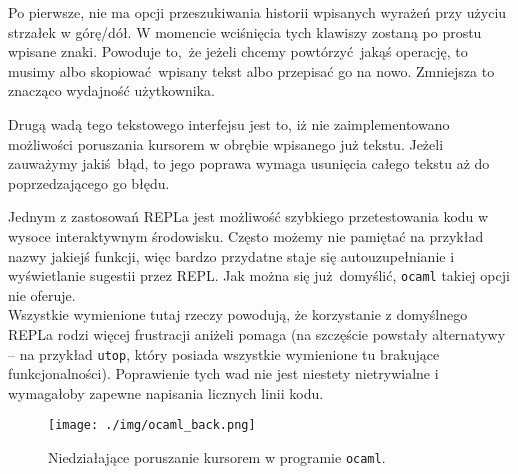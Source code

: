 \documentclass[12pt, a4paper, oneside]{report}
\begin{document}
Po pierwsze, nie ma opcji przeszukiwania historii wpisanych wyrażeń przy użyciu
strzałek w górę/dół. W momencie wciśnięcia tych klawiszy zostaną po prostu
wpisane znaki. Powoduje to, że jeżeli chcemy powtórzyć jakąś operację, to musimy
albo skopiować wpisany tekst albo przepisać go na nowo. Zmniejsza to znacząco
wydajność użytkownika.

Drugą wadą tego tekstowego interfejsu jest to, iż nie zaimplementowano
możliwości poruszania kursorem w obrębie wpisanego już tekstu. Jeżeli zauważymy
jakiś błąd, to jego poprawa wymaga usunięcia całego tekstu aż do poprzedzającego
go błędu.

Jednym z zastosowań REPLa jest możliwość szybkiego przetestowania kodu w wysoce
interaktywnym środowisku. Często możemy nie pamiętać na przykład nazwy jakiejś 
funkcji, więc bardzo przydatne staje się autouzupełnianie i wyświetlanie
sugestii przez REPL. Jak można się już domyślić, \texttt{ocaml} takiej
opcji nie oferuje.\\

Wszystkie wymienione tutaj rzeczy powodują, że korzystanie z domyślnego REPLa 
rodzi więcej frustracji aniżeli pomaga (na szczęście powstały alternatywy -- na 
przykład \texttt{utop}, który posiada wszystkie wymienione tu brakujące 
funkcjonalności). Poprawienie tych wad nie jest niestety nietrywialne i wymagałoby zapewne
napisania licznych linii kodu.

\begin{figure}
    \centering
    \texttt{[image: ./img/ocaml\_back.png]}
    \caption{Niedziałające poruszanie kursorem w programie \texttt{ocaml}.}
    \label{figure:ocaml-back}
\end{figure}
\end{document}
